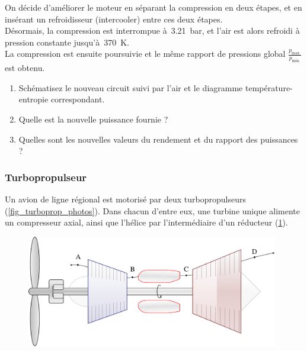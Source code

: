 	On décide d’améliorer le moteur en séparant la compression en deux étapes, et en insérant un refroidisseur (intercooler) entre ces deux étapes.\\
	Désormais, la compression est interrompue à~\SI{3,21}{\bar}, et l’air est alors refroidi à pression constante jusqu’à~\SI{370}{\kelvin}.\\
	La compression est ensuite poursuivie et le même rapport de pressions global $\frac{p_\text{max.}}{p_\text{min.}}$ est obtenu.
	
	\begin{enumerate}
		\item Schématisez le nouveau circuit suivi par l’air et le diagramme température-entropie correspondant.
		\item Quelle est la nouvelle puissance fournie ?
		\item Quelles sont les nouvelles valeurs du rendement et du rapport des puissances ?
	\end{enumerate}

\subsubsection{Turbopropulseur}

	
	Un avion de ligne régional est motorisé par deux turbopropulseurs (\cref{fig_turboprop_photos}). Dans chacun d’entre eux, une turbine unique alimente un compresseur axial, ainsi que l’hélice par l’intermédiaire d’un réducteur (\cref{fig_turboprop_circuit}).
	
	\begin{figure}
		\begin{center}
			\includegraphics[width=11cm]{images/circuit_turboprop.png}
		\end{center}
		\label{fig_turboprop_circuit}
	\end{figure}
	

